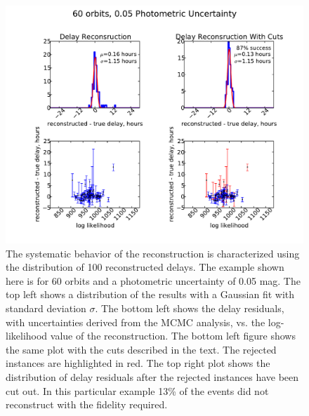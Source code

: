 \documentclass{emulateapj}
\begin{document}
\begin{figure}[t]
\begin{center}
\includegraphics[width=\linewidth]{./ana_ll_example.pdf}
\caption{The systematic behavior of the reconstruction is characterized using the distribution of 100 reconstructed delays. The example shown here is for 60 orbits and a photometric uncertainty of 0.05 mag. The top left shows a distribution of the results with a Gaussian fit with standard deviation $\sigma$. The bottom left shows the delay residuals, with uncertainties derived from the MCMC analysis, vs. the log-likelihood value of the reconstruction. The bottom left figure shows the same plot with the cuts described in the text. The rejected instances are highlighted in red. The top right plot shows the distribution of delay residuals after the rejected instances have been cut out. In this particular example 13\% of the events did not reconstruct with the fidelity required.}\label{fig:volume}
\end{center}
\end{figure}
\end{document}
